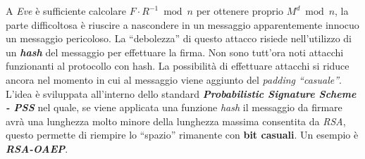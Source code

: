 A \textit{Eve} è sufficiente calcolare $F \cdot R^{-1} \bmod n$ per ottenere proprio $M^d \bmod n$, la parte difficoltosa è riuscire a nascondere in un messaggio apparentemente innocuo un messaggio pericoloso. La ``debolezza'' di questo attacco risiede nell'utilizzo di un \textbf{\textit{hash}} del messaggio per effettuare la firma. Non sono tutt'ora noti attacchi funzionanti al protocollo con hash. La possibilità di effettuare attacchi si riduce ancora nel momento in cui al messaggio viene aggiunto del \textit{padding ``casuale''}. L'idea è sviluppata all'interno dello standard \textbf{\textit{Probabilistic Signature Scheme - PSS}} nel quale, se viene applicata una funzione \textit{hash} il messaggio da firmare avrà una lunghezza molto minore della lunghezza massima consentita da \textit{RSA}, questo permette di riempire lo ``spazio'' rimanente con \textbf{bit casuali}. Un esempio è \textbf{\textit{RSA-OAEP}}.

\newpage
